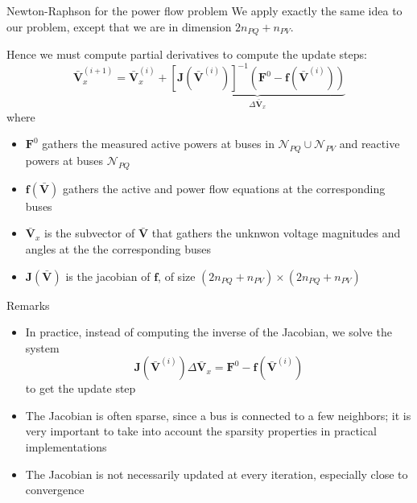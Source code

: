 \begin{frame}[allowframebreaks]{Newton-Raphson for the power flow problem}
    We apply exactly the same idea to our problem, except that we are in dimension $2 n_{PQ} + n_{PV}$.
    
    Hence we must compute partial derivatives to compute the update steps:
    $$\mathbf{\bar{V}}^{(i+1)}_x = \mathbf{\bar{V}}^{(i)}_x + \underbrace{\left[\mathbf{J}(\mathbf{\bar{V}}^{(i)})\right]^{-1} (\mathbf{F}^0-\mathbf{f}(\mathbf{\bar{V}}^{(i)}))}_{\Delta \mathbf{\bar{V}}_x}$$
    where
    \begin{itemize}
        \item $\mathbf{F}^0$ gathers the measured active powers at buses in $\mathcal{N}_{PQ} \cup \mathcal{N}_{PV}$ and reactive powers at buses $\mathcal{N}_{PQ}$
        \item $\mathbf{f}(\mathbf{\bar{V}})$ gathers the active and power flow equations at the corresponding buses
        \item $\mathbf{\bar{V}}_x$ is the subvector of $\mathbf{\bar{V}}$ that gathers the unknwon voltage magnitudes and angles at the the corresponding buses
        \item $\mathbf{J}(\mathbf{\bar{V}})$ is the jacobian of $\mathbf{f}$, of size $(2 n_{PQ} + n_{PV}) \times (2 n_{PQ} + n_{PV})$
    \end{itemize}

\end{frame}

\begin{frame}{Remarks}
    \begin{itemize}
        \item In practice, instead of computing the inverse of the Jacobian, we solve the system
        \begin{equation}
        \mathbf{J}(\mathbf{\bar{V}}^{(i)}) \Delta \mathbf{\bar{V}}_x = \mathbf{F}^0-\mathbf{f}(\mathbf{\bar{V}}^{(i)}) \label{eq:NR_step}
        \end{equation}
        to get the update step
        \item The Jacobian is often sparse, since a bus is connected to a few neighbors; it is very important to take into account the sparsity properties in practical implementations
        \item The Jacobian is not necessarily updated at every iteration, especially close to convergence
    \end{itemize}
\end{frame}

